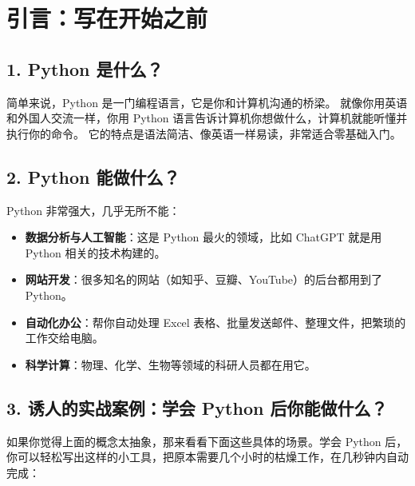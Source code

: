 \section*{引言：写在开始之前}

\subsection*{1. Python 是什么？}
简单来说，Python 是一门编程语言，它是你和计算机沟通的桥梁。
就像你用英语和外国人交流一样，你用 Python 语言告诉计算机你想做什么，计算机就能听懂并执行你的命令。
它的特点是语法简洁、像英语一样易读，非常适合零基础入门。

\subsection*{2. Python 能做什么？}
Python 非常强大，几乎无所不能：
\begin{itemize}
    \item \textbf{数据分析与人工智能}：这是 Python 最火的领域，比如 ChatGPT 就是用 Python 相关的技术构建的。
    \item \textbf{网站开发}：很多知名的网站（如知乎、豆瓣、YouTube）的后台都用到了 Python。
    \item \textbf{自动化办公}：帮你自动处理 Excel 表格、批量发送邮件、整理文件，把繁琐的工作交给电脑。
    \item \textbf{科学计算}：物理、化学、生物等领域的科研人员都在用它。
\end{itemize}

\subsection*{3. 诱人的实战案例：学会 Python 后你能做什么？}
如果你觉得上面的概念太抽象，那来看看下面这些具体的场景。学会 Python 后，你可以轻松写出这样的小工具，把原本需要几个小时的枯燥工作，在几秒钟内自动完成：

